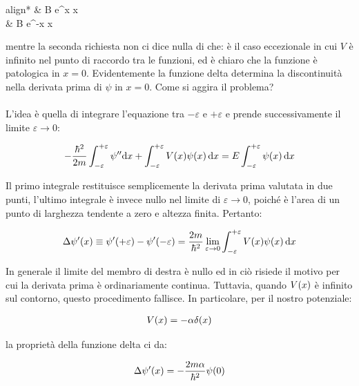 \begin{itemize}
	\begin{empheq}[left={\psi \qty(x)=\empheqlbrace}]{align*}
		& B e^{\kappa x} \quad {} \quad x  \\
  		& B e^{-\kappa x} \quad {} \quad x 
	\end{empheq}
	
		mentre la seconda richiesta non ci dice nulla di che: è il caso eccezionale in cui $V$ è infinito nel punto di raccordo tra le funzioni, ed è chiaro che la funzione è patologica in $x = 0$. Evidentemente la funzione delta determina la discontinuità nella derivata prima di $\psi$ in $x = 0$. Come si aggira il problema?
		\\
		\\
		L'idea è quella di integrare l'equazione tra $- \varepsilon$ e $+ \varepsilon$ e prende successivamente il limite $\varepsilon \to 0$:
		
	\begin{align*}
		-\frac{\hbar^2}{2m} \int_{- \varepsilon}^{+ \varepsilon} \psi'' \dd x + \int_{- \varepsilon}^{+ \varepsilon} V\qty(x) \psi\qty(x) \, \dd x = E \int_{- \varepsilon}^{+ \varepsilon} \psi\qty(x) \, \dd x
	\end{align*}
	
		Il primo integrale restituisce semplicemente la derivata prima valutata in due punti, l'ultimo integrale è invece nullo nel limite di $\varepsilon \to 0$, poiché è l'area di un punto di larghezza tendente a zero e altezza finita. Pertanto:

	\begin{align*}
		\Delta \psi'\qty(x) \equiv \psi'\qty(+ \varepsilon) - \psi'\qty(-\varepsilon) = \frac{2m}{\hbar^2} \lim_{\varepsilon \to 0} \int_{- \varepsilon}^{+ \varepsilon} V\qty(x) \psi\qty(x) \, \dd x
	\end{align*}	
	
		In generale il limite del membro di destra è nullo ed in ciò risiede il motivo per cui la derivata prima è ordinariamente continua. Tuttavia, quando $V\qty(x)$ è infinito sul contorno, questo procedimento fallisce. In particolare, per il nostro potenziale:
		
	\begin{align*}
		V\qty(x)= - \alpha \delta\qty(x)
	\end{align*}
	
		la proprietà della funzione delta ci da:
		
	\begin{align*}
		\Delta \psi'\qty(x) = - \frac{2m\alpha}{\hbar^2} \psi\qty(0)
	\end{align*}
	

\end{itemize}
